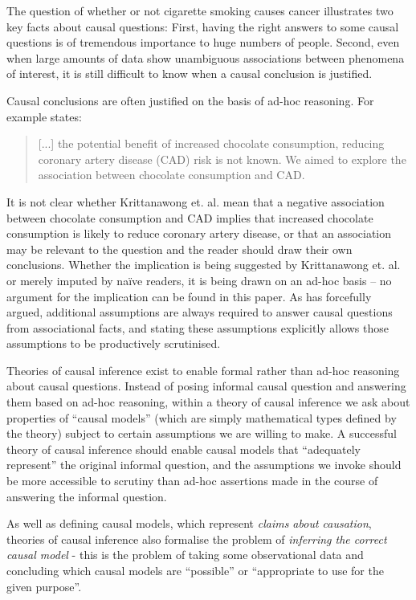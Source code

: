 The question of whether or not cigarette smoking causes cancer illustrates two key facts about causal questions: First, having the right answers to some causal questions is of tremendous importance to huge numbers of people. Second, even when large amounts of data show unambiguous associations between phenomena of interest, it is still difficult to know when a causal conclusion is justified.

Causal conclusions are often justified on the basis of ad-hoc reasoning. For example \citet{krittanawong_association_2020} states:

\begin{quote}
[...] the potential benefit of increased chocolate consumption, reducing coronary artery disease (CAD) risk is not known. We aimed to explore the association between chocolate consumption and CAD.
\end{quote}

It is not clear whether Krittanawong et. al. mean that a negative association between chocolate consumption and CAD implies that increased chocolate consumption is likely to reduce coronary artery disease, or that an association may be relevant to the question and the reader should draw their own conclusions. Whether the implication is being suggested by Krittanawong et. al. or merely imputed by na\"ive readers, it is being drawn on an ad-hoc basis -- no argument for the implication can be found in this paper. As \citet{pearl_causality:_2009} has forcefully argued, additional assumptions are always required to answer causal questions from associational facts, and stating these assumptions explicitly allows those assumptions to be productively scrutinised.

Theories of causal inference exist to enable formal rather than ad-hoc reasoning about causal questions. Instead of posing informal causal question and answering them based on ad-hoc reasoning, within a theory of causal inference we ask about properties of ``causal models'' (which are simply mathematical types defined by the theory) subject to certain assumptions we are willing to make. A successful theory of causal inference should enable causal models that ``adequately represent'' the original informal question, and the assumptions we invoke should be more accessible to scrutiny than ad-hoc assertions made in the course of answering the informal question.

As well as defining causal models, which represent \emph{claims about causation}, theories of causal inference also formalise the problem of \emph{inferring the correct causal model} - this is the problem of taking some observational data and concluding which causal models are ``possible'' or ``appropriate to use for the given purpose''.

